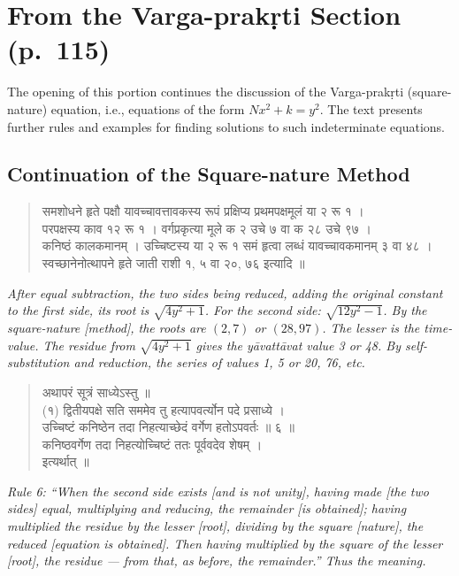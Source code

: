 \documentclass[11pt,a4paper]{article}
\newcommand{\cnote}[1]{\textcolor{notecolor}{\textit{#1}}}
\newcommand{\dev}[1]{{\devanagarifont #1}}
\newenvironment{sanskritverse}{%
  \begin{verse}
}{%
  \end{verse}
}
\begin{document}
\section{From the Varga-prakṛti Section (p.\ 115)}

The opening of this portion continues the discussion of the Varga-prakṛti (square-nature) equation, i.e., equations of the form $Nx^2 + k = y^2$. The text presents further rules and examples for finding solutions to such indeterminate equations.

\subsection*{Continuation of the Square-nature Method}

\begin{sanskritverse}
\dev{%
समशोधने हृते पक्षौ यावच्चावत्तावकस्य रूपं प्रक्षिप्य प्रथमपक्षमूलं या २ रू १ ।\\
परपक्षस्य काव १२ रू १ । वर्गप्रकृत्या मूले क २ उचे ७ वा क २८ उचे ९७ ।\\
कनिष्ठं कालकमानम् । उच्चिष्टस्य या २ रू १ समं हृत्वा लब्धं यावच्चावकमानम् ३ वा ४८ ।\\
स्वच्छानेनोत्थापने हृते जाती राशी १, ५ वा २०, ७६ इत्यादि ॥}
\end{sanskritverse}

\cnote{After equal subtraction, the two sides being reduced, adding the original constant to the first side, its root is $\sqrt{4y^2 + 1}$. For the second side: $\sqrt{12y^2 - 1}$. By the square-nature [method], the roots are $(2, 7)$ or $(28, 97)$. The lesser is the time-value. The residue from $\sqrt{4y^2 + 1}$ gives the yāvattāvat value 3 or 48. By self-substitution and reduction, the series of values 1, 5 or 20, 76, etc.}

\bigskip

\begin{sanskritverse}
\dev{%
अथापरं सूत्रं साध्येऽस्तु ॥\\[0.5em]
(१) द्वितीयपक्षे सति सममेव तु हत्यापवर्त्योन पदे प्रसाध्ये ।\\
उच्चिष्टं कनिष्ठेन तदा निहत्याच्छेदं वर्गेण हतोऽपवर्तः ॥ ६ ॥\\
कनिष्ठवर्गेण तदा निहत्योच्चिष्टं ततः पूर्ववदेव शेषम् ।\\
इत्यर्थात् ॥}
\end{sanskritverse}

\cnote{Rule 6: ``When the second side exists [and is not unity], having made [the two sides] equal, multiplying and reducing, the remainder [is obtained]; having multiplied the residue by the lesser [root], dividing by the square [nature], the reduced [equation is obtained]. Then having multiplied by the square of the lesser [root], the residue --- from that, as before, the remainder.'' Thus the meaning.}
\end{document}
